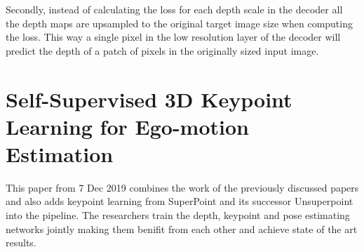 Secondly, instead of calculating the loss for each depth scale in the decoder all the depth maps are upsampled to the original target image size when computing the loss. This way a single pixel in the low resolution layer of the decoder will predict the depth of a patch of pixels in the originally sized input image.

\section{Self-Supervised 3D Keypoint Learning for Ego-motion Estimation \cite{keypointdepth}}

This paper from 7 Dec 2019 combines the work of the previously discussed papers and also adds keypoint learning from SuperPoint\cite{superpoint} and its successor Unsuperpoint\cite{unsuperpoint} into the pipeline.
The researchers train the depth, keypoint and pose estimating networks jointly making them benifit from each other and achieve state of the art results.